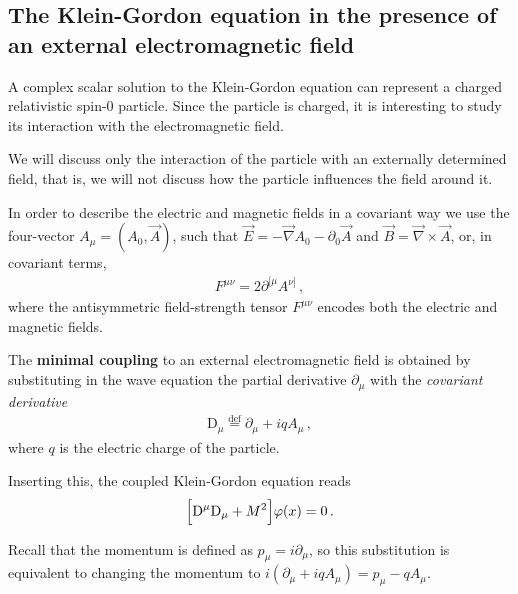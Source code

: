 \documentclass[main.tex]{subfiles}
\begin{document}

\subsection{The Klein-Gordon equation in the presence of an external electromagnetic field}

A complex scalar solution to the Klein-Gordon equation can represent a charged relativistic spin-0 particle. 
Since the particle is charged, it is interesting to study its interaction with the electromagnetic field.

We will discuss only the interaction of the particle with an externally determined field, that is, we will not discuss how the particle influences the field around it.

In order to describe the electric and magnetic fields in a covariant way we use the four-vector \(A_{\mu } = (A_0 , \vec{A})\), such that \(\vec{E} = - \vec{\nabla} A_0 - \partial_{0} \vec{A}\) and \(\vec{B} = \vec{\nabla} \times \vec{A}\), or, in covariant terms, 
%
\begin{align}
F^{ \mu \nu } = 2\partial^{[\mu } A^{\nu ]}
\,,
\end{align}
%
where the antisymmetric field-strength tensor \(F^{\mu \nu }\) encodes both the electric and magnetic fields. 

\begin{definition}
The \textbf{minimal coupling} to an external electromagnetic field is obtained by substituting in the wave equation the partial derivative \(\partial_{\mu }\) with the \emph{covariant derivative}
%
\begin{align}
\mathrm{D}_{\mu } \overset{\text{def}}{=} \partial_{\mu } + i q A_{\mu }
\,,
\end{align}
%
where \(q\) is the electric charge of the particle. 
\end{definition}

Inserting this, the coupled Klein-Gordon equation reads 
%
\begin{align}
\qty[\mathrm{D}^{\mu } \mathrm{D}_{\mu } + M^2 ] \varphi (x) = 0 
\,.
\end{align}

Recall that the momentum is defined as \(p_{\mu } = i \partial_{\mu }\), so this substitution is equivalent to changing the momentum to \(i (\partial_{\mu } +iqA_{\mu }) =  p_{\mu } - q A_{\mu }\).
\end{document}

